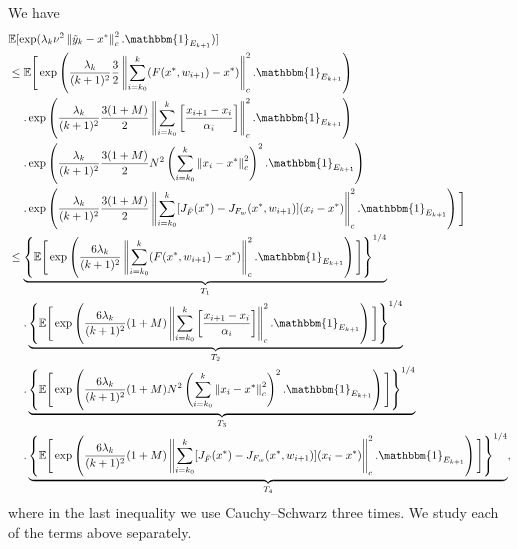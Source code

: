 \documentclass[letterpaper, 10 pt]{article}
\newcommand{\E}{\mathbb{E}}
\newcommand{\ty}{\tilde{y}}
\begin{document}
We have
\begin{align}
&\E[\exp(\lambda_k \nu^2\left\|\ty_k-x^*\right\|^2_c . \mathbbm{1}_{E_{k+1}})]\nonumber\\ 
&\leq\E\Bigg[\exp\left(\frac{\lambda_k}{(k+1)^2} \frac{3}{2}\left\|\sum\limits_{i=k_0}^{k}   (F(x^*,w_{i+1})-x^*) \right\|^2_c.\mathbbm{1}_{E_{k+1}} \right)\nonumber\\ 
&\quad~.\exp\left( \frac{\lambda_k}{(k+1)^2} \frac{3(1+M)}{2} \left\| \sum\limits_{i=k_0}^{k} \left[\frac{x_{i+1}- x_i}{\alpha_i}  \right]\right\|^2_c.\mathbbm{1}_{E_{k+1}}\right)\nonumber\\
&\quad~.\exp\left( \frac{\lambda_k}{(k+1)^2} \frac{3(1+M)}{2}N^2\left(\sum\limits_{i=k_0}^{k}\left\|x_i-x^*\right\|_c^2\right)^2 .\mathbbm{1}_{E_{k+1}}\right)\nonumber\\
&\quad~.\exp\left( \frac{\lambda_k}{(k+1)^2}\frac{3(1+M)}{2} \left\|\sum\limits_{i=k_0}^{k} [J_{\bar{F}}(x^*)-J_{F_w}(x^*,w_{i+1})](x_i-x^*) \right\|^2_c.\mathbbm{1}_{E_{k+1}}\right)\Bigg] \nonumber\\
&\leq\underbrace{\left\{\E\Bigg[\exp\left(\frac{6\lambda_k}{(k+1)^2}  \left\| \sum\limits_{i=k_0}^{k}   (F(x^*,w_{i+1})-x^*) \right\|^2_c.\mathbbm{1}_{E_{k+1}} \right)\Bigg]\right\}^{1/4}}_{T_1}\nonumber\\ 
&\quad~.\underbrace{\left\{\E\Bigg[\exp\left( \frac{6\lambda_k}{(k+1)^2}(1+M) \left\| \sum\limits_{i=k_0}^{k} \left[\frac{x_{i+1}- x_i}{\alpha_i}  \right]\right\|^2_c.\mathbbm{1}_{E_{k+1}}\right)\Bigg]\right\}^{1/4}}_{T_2} \nonumber\\
&\quad~.\underbrace{\left\{\E\Bigg[\exp\left( \frac{6\lambda_k}{(k+1)^2}(1+M)N^2\left(\sum\limits_{i=k_0}^{k}\left\|x_i-x^*\right\|_c^2\right)^2 .\mathbbm{1}_{E_{k+1}}\right)\Bigg]\right\}^{1/4}}_{T_3} \nonumber\\
&\quad~.\underbrace{\left\{\E\Bigg[\exp\left( \frac{6\lambda_k}{(k+1)^2}(1+M) \left\|\sum\limits_{i=k_0}^{k} [J_{\bar{F}}(x^*)-J_{F_w}(x^*,w_{i+1})](x_i-x^*) \right\|^2_c.\mathbbm{1}_{E_{k+1}}\right)\Bigg]\right\}^{1/4}}_{T_4} ,\label{eq:T_1234}
\end{align}
where in the last inequality we use Cauchy–Schwarz three times. We study each of the terms above separately. \\
\end{document}
